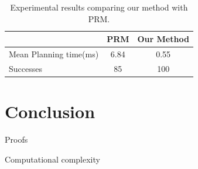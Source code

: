 \documentclass[letterpaper, 10 pt, conference]{ieeeconf}  %
\begin{document}
\begin{table}
  \begin{center}
    \begin{tabular}{ l c c }
       & \textsf{PRM} & Our Method \\ 
     \hline
     Mean Planning time(ms) & 6.84 & 0.55 \\  
     Successes & 85 & 100 %
    \end{tabular}
    \caption{Experimental results comparing our method with PRM.}
    \label{tab:stats}
  \end{center}
\end{table}

\section{Conclusion}
Proofs

Computational complexity



\end{document}
